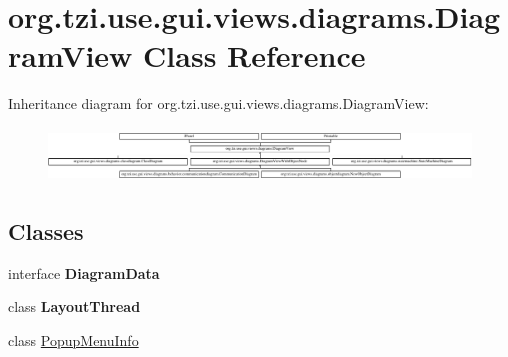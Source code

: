 \hypertarget{classorg_1_1tzi_1_1use_1_1gui_1_1views_1_1diagrams_1_1_diagram_view}{\section{org.\-tzi.\-use.\-gui.\-views.\-diagrams.\-Diagram\-View Class Reference}
\label{classorg_1_1tzi_1_1use_1_1gui_1_1views_1_1diagrams_1_1_diagram_view}
}
Inheritance diagram for org.\-tzi.\-use.\-gui.\-views.\-diagrams.\-Diagram\-View\-:\begin{figure}[H]
\begin{center}
\leavevmode
\includegraphics[height=1.455491cm]{classorg_1_1tzi_1_1use_1_1gui_1_1views_1_1diagrams_1_1_diagram_view}
\end{center}
\end{figure}
\subsection*{Classes}
\begin{DoxyCompactItemize}
\item 
interface {\bfseries Diagram\-Data}
\item 
class {\bfseries Layout\-Thread}
\item 
class \hyperlink{classorg_1_1tzi_1_1use_1_1gui_1_1views_1_1diagrams_1_1_diagram_view_1_1_popup_menu_info}{Popup\-Menu\-Info}
\end{DoxyCompactItemize}
